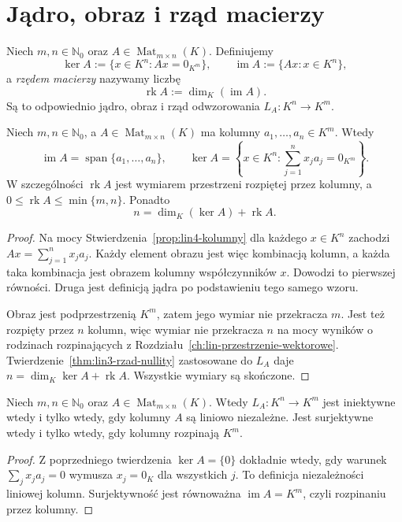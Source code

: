 \section{Jądro, obraz i rząd macierzy}
\label{sec:lin4-rzad-macierzy}

\begin{definicja}
\label{def:lin4-rzad-macierzy}
Niech \(m,n\in\mathbb N_0\) oraz
\(A\in\operatorname{Mat}_{m\times n}(K)\).
Definiujemy
\[
 \ker A:=\{x\in K^n:Ax=0_{K^m}\},\qquad
 \operatorname{im}A:=\{Ax:x\in K^n\},
\]
a \emph{rzędem macierzy} nazywamy liczbę
\[
 \operatorname{rk}A:=\dim_K(\operatorname{im}A).
\]
Są to odpowiednio jądro, obraz i rząd
odwzorowania \(L_A\colon K^n\to K^m\).
\end{definicja}

\begin{twierdzenie}
\label{thm:lin4-rzad-kolumn}
Niech \(m,n\in\mathbb N_0\), a
\(A\in\operatorname{Mat}_{m\times n}(K)\)
ma kolumny \(a_1,\ldots,a_n\in K^m\).
Wtedy
\[
 \operatorname{im}A=\operatorname{span}\{a_1,\ldots,a_n\},
 \qquad
 \ker A=\left\{x\in K^n:
   \sum_{j=1}^{n}x_ja_j=0_{K^m}\right\}.
\]
W szczególności
\(\operatorname{rk}A\) jest wymiarem
przestrzeni rozpiętej przez kolumny,
a \(0\leq\operatorname{rk}A\leq\min\{m,n\}\).
Ponadto
\[
 n=\dim_K(\ker A)+\operatorname{rk}A.
\]
\end{twierdzenie}
\begin{proof}
Na mocy Stwierdzenia~\ref{prop:lin4-kolumny}
dla każdego \(x\in K^n\) zachodzi
\(Ax=\sum_{j=1}^{n}x_ja_j\).
Każdy element obrazu jest więc
kombinacją kolumn, a każda taka kombinacja
jest obrazem kolumny współczynników \(x\).
Dowodzi to pierwszej równości.
Druga jest definicją jądra po podstawieniu
tego samego wzoru.

Obraz jest podprzestrzenią \(K^m\),
zatem jego wymiar nie przekracza \(m\).
Jest też rozpięty przez \(n\) kolumn,
więc wymiar nie przekracza \(n\)
na mocy wyników o rodzinach rozpinających
z Rozdziału~\ref{ch:lin-przestrzenie-wektorowe}.
Twierdzenie~\ref{thm:lin3-rzad-nullity}
zastosowane do \(L_A\) daje
\(n=\dim_K\ker A+\operatorname{rk}A\).
Wszystkie wymiary są skończone.
\end{proof}

\begin{wniosek}
\label{cor:lin4-kryteria-kolumn}
Niech \(m,n\in\mathbb N_0\) oraz
\(A\in\operatorname{Mat}_{m\times n}(K)\).
Wtedy \(L_A\colon K^n\to K^m\) jest
iniektywne wtedy i tylko wtedy, gdy
kolumny \(A\) są liniowo niezależne.
Jest surjektywne wtedy i tylko wtedy,
gdy kolumny rozpinają \(K^m\).
\end{wniosek}
\begin{proof}
Z poprzedniego twierdzenia \(\ker A=\{0\}\)
dokładnie wtedy, gdy warunek
\(\sum_jx_ja_j=0\) wymusza \(x_j=0_K\)
dla wszystkich \(j\).
To definicja niezależności liniowej kolumn.
Surjektywność jest równoważna
\(\operatorname{im}A=K^m\),
czyli rozpinaniu przez kolumny.
\end{proof}

